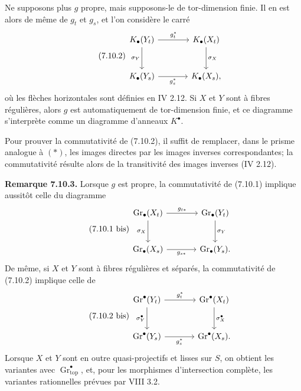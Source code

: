 \documentclass[11pt]{article}
\newcommand{\Gr}{\operatorname{Gr}}
\providecommand{\Gr}{\operatorname{Gr}}
\providecommand{\Gr}{\operatorname{G}}
\begin{document}
Ne supposons plus \(g\) propre, mais supposons-le de tor-dimension finie. Il en est alors de même de \(g_t\) et \(g_s\), et l'on considère le carré
\begin{equation}\tag{7.10.2}
\begin{tikzcd}[column sep=large,row sep=large]
K_\bullet(Y_t) \arrow[r,"g_t^*"] \arrow[d,"\sigma_Y"'] &
K_\bullet(X_t) \arrow[d,"\sigma_X"]\\
K_\bullet(Y_s) \arrow[r,"g_s^*"'] &
K_\bullet(X_s),
\end{tikzcd}
\end{equation}
où les flèches horizontales sont définies en IV 2.12. Si \(X\) et \(Y\) sont à fibres régulières, alors \(g\) est automatiquement de tor-dimension finie, et ce diagramme s'interprète comme un diagramme d'anneaux \(K^\bullet\).

Pour prouver la commutativité de (7.10.2), il suffit de remplacer, dans le prisme analogue à \((*)\), les images directes par les images inverses correspondantes; la commutativité résulte alors de la transitivité des images inverses (IV 2.12).

\textbf{Remarque 7.10.3.} Lorsque \(g\) est propre, la commutativité de (7.10.1) implique aussitôt celle du diagramme
\begin{equation}\tag{7.10.1 bis}
\begin{tikzcd}[column sep=large,row sep=large]
\Gr_\bullet(X_t) \arrow[r,"g_{t*}"] \arrow[d,"\sigma_X"'] &
\Gr_\bullet(Y_t) \arrow[d,"\sigma_Y"]\\
\Gr_\bullet(X_s) \arrow[r,"g_{s*}"'] &
\Gr_\bullet(Y_s).
\end{tikzcd}
\end{equation}
De même, si \(X\) et \(Y\) sont à fibres régulières et séparés, la commutativité de (7.10.2) implique celle de
\begin{equation}\tag{7.10.2 bis}
\begin{tikzcd}[column sep=large,row sep=large]
\Gr^\bullet(Y_t) \arrow[r,"g_t^*"] \arrow[d,"\sigma_Y^\bullet"'] &
\Gr^\bullet(X_t) \arrow[d,"\sigma_X^\bullet"]\\
\Gr^\bullet(Y_s) \arrow[r,"g_s^*"'] &
\Gr^\bullet(X_s).
\end{tikzcd}
\end{equation}
Lorsque \(X\) et \(Y\) sont en outre quasi-projectifs et lisses sur \(S\), on obtient les variantes avec \(\Gr^\bullet_{\mathrm{top}}\), et, pour les morphismes d'intersection complète, les variantes rationnelles prévues par VIII 3.2.
\end{document}
